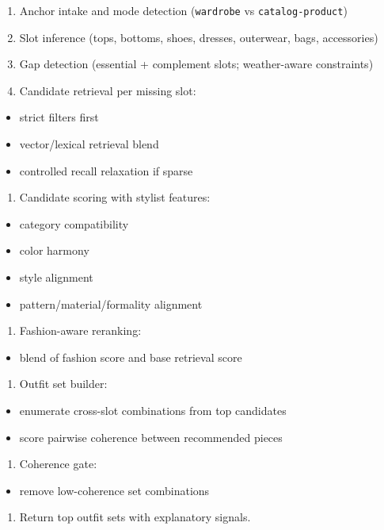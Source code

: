 \documentclass[12pt,a4paper]{report}
\begin{document}
\begin{enumerate}
\item Anchor intake and mode detection (\texttt{wardrobe} vs \texttt{catalog-product})
\item Slot inference (tops, bottoms, shoes, dresses, outerwear, bags, accessories)
\item Gap detection (essential + complement slots; weather-aware constraints)
\item Candidate retrieval per missing slot:
\end{enumerate}
\begin{itemize}
\item strict filters first
\item vector/lexical retrieval blend
\item controlled recall relaxation if sparse
\end{itemize}
\begin{enumerate}
\item Candidate scoring with stylist features:
\end{enumerate}
\begin{itemize}
\item category compatibility
\item color harmony
\item style alignment
\item pattern/material/formality alignment
\end{itemize}
\begin{enumerate}
\item Fashion-aware reranking:
\end{enumerate}
\begin{itemize}
\item blend of fashion score and base retrieval score
\end{itemize}
\begin{enumerate}
\item Outfit set builder:
\end{enumerate}
\begin{itemize}
\item enumerate cross-slot combinations from top candidates
\item score pairwise coherence between recommended pieces
\end{itemize}
\begin{enumerate}
\item Coherence gate:
\end{enumerate}
\begin{itemize}
\item remove low-coherence set combinations
\end{itemize}
\begin{enumerate}
\item Return top outfit sets with explanatory signals.
\end{enumerate}
\end{document}
